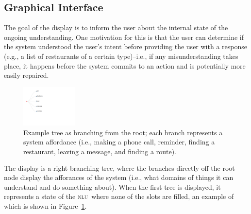 \documentclass[11pt]{article}
\newcommand{\nlu}[0]{\textsc{nlu}}
\begin{document}
\subsection{Graphical Interface}
\label{section:display}

The goal of the display is to inform the user about the internal state of the ongoing understanding. One motivation for this is that the user can determine if the system understood the user's intent before providing the user with a response (e.g., a list of restaurants of a certain type)--i.e., if any misunderstanding takes place, it happens before the system commits to an action and is potentially more easily repaired. 

\begin{figure}
  \centering
      \includegraphics[width=0.25\textwidth]{figures/diatree-affordances.pdf}	
      \caption{Example tree as branching from the root; each branch represents a system affordance (i.e., making a phone call, reminder, finding a restaurant, leaving a message, and finding a route). \label{fig:afforances}}
\end{figure}

The display is a right-branching tree, where the branches directly off the root node display the afforances of the system (i.e., what domains of things it can understand and do something about). When the first tree is displayed, it represents a state of the \nlu\ where none of the slots are filled, an example of which is shown in Figure~\ref{fig:afforances}. 
\end{document}
